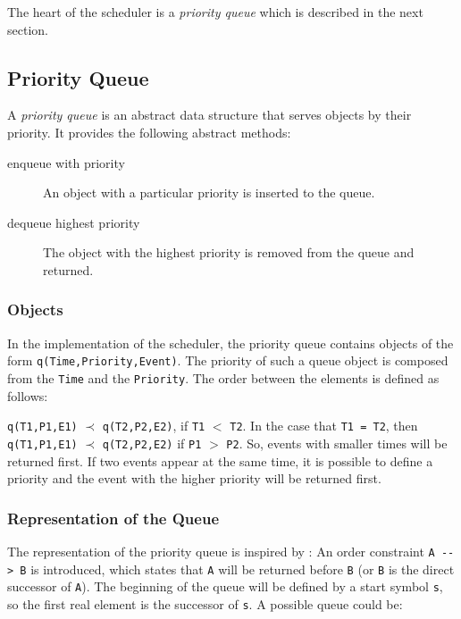 The heart of the scheduler is a \emph{priority queue} which is described in the next section.

\subsection{Priority Queue}

A \emph{priority queue} is an abstract data structure that serves objects by their priority. It provides the following abstract methods:

\begin{description}
 \item[enqueue with priority] An object with a particular priority is inserted to the queue. 
 \item[dequeue highest priority] The object with the highest priority is removed from the queue and returned.
\end{description}

\subsubsection{Objects}

In the implementation of the scheduler, the priority queue contains objects of the form \verb|q(Time,Priority,Event)|. The priority of such a queue object is composed from the \verb|Time| and the \verb|Priority|. The order between the elements is defined as follows:

\begin{definition}
\verb|q(T1,P1,E1)| $\prec$ \verb|q(T2,P2,E2)|, if \verb|T1| $<$ \verb|T2|. In the case that \verb|T1 = T2|, then \verb|q(T1,P1,E1)| $\prec$ \verb|q(T2,P2,E2)| if \verb|P1| $>$ \verb|P2|. So, events with smaller times will be returned first. If two events appear at the same time, it is possible to define a priority and the event with the higher priority will be returned first. 
\end{definition}

\subsubsection{Representation of the Queue}

The representation of the priority queue is inspired by \cite[38\psqq]{fru_chr_book_2009}: An order constraint \verb|A --> B| is introduced, which states that \verb|A| will be returned before \verb|B| (or \verb|B| is the direct successor of \verb|A|). The beginning of the queue will be defined by a start symbol \verb|s|, so the first real element is the successor of \verb|s|. A possible queue could be:

